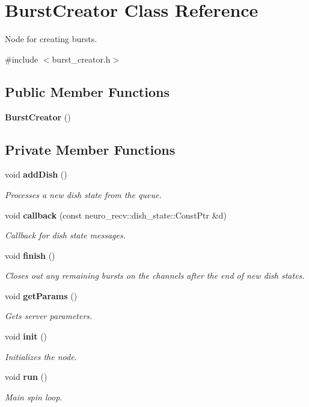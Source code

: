 \section{\-Burst\-Creator \-Class \-Reference}
\label{classBurstCreator}


\-Node for creating bursts.  




{\ttfamily \#include $<$burst\-\_\-creator.\-h$>$}

\subsection*{\-Public \-Member \-Functions}
\begin{DoxyCompactItemize}
\item 
{\bf \-Burst\-Creator} ()
\end{DoxyCompactItemize}
\subsection*{\-Private \-Member \-Functions}
\begin{DoxyCompactItemize}
\item 
void {\bf add\-Dish} ()
\begin{DoxyCompactList}\small\item\em \-Processes a new dish state from the queue. \end{DoxyCompactList}\item 
void {\bf callback} (const neuro\-\_\-recv\-::dish\-\_\-state\-::\-Const\-Ptr \&d)
\begin{DoxyCompactList}\small\item\em \-Callback for dish state messages. \end{DoxyCompactList}\item 
void {\bf finish} ()
\begin{DoxyCompactList}\small\item\em \-Closes out any remaining bursts on the channels after the end of new dish states. \end{DoxyCompactList}\item 
void {\bf get\-Params} ()
\begin{DoxyCompactList}\small\item\em \-Gets server parameters. \end{DoxyCompactList}\item 
void {\bf init} ()
\begin{DoxyCompactList}\small\item\em \-Initializes the node. \end{DoxyCompactList}\item 
void {\bf run} ()
\begin{DoxyCompactList}\small\item\em \-Main spin loop. \end{DoxyCompactList}\end{DoxyCompactItemize}
